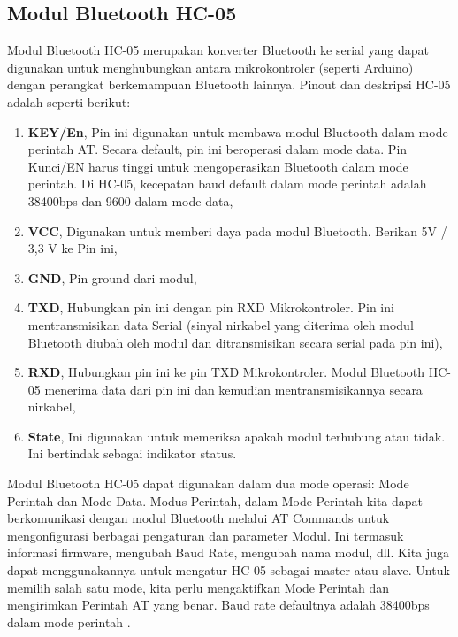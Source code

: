 \subsection{Modul Bluetooth HC-05}
\vspace{1ex}

Modul Bluetooth HC-05 merupakan konverter Bluetooth ke serial yang dapat digunakan untuk menghubungkan antara mikrokontroler (seperti Arduino) dengan perangkat berkemampuan Bluetooth lainnya. Pinout dan deskripsi HC-05 adalah seperti berikut:
\begin{enumerate}
	\vspace{-2mm}
	\item \textbf{KEY/En}, Pin ini digunakan untuk membawa modul Bluetooth dalam mode perintah AT. Secara default, pin ini beroperasi dalam mode data. Pin Kunci/EN harus tinggi untuk mengoperasikan Bluetooth dalam mode perintah. Di HC-05, kecepatan baud default dalam mode perintah adalah 38400bps dan 9600 dalam mode data,
	\vspace{-2mm}
	\item \textbf{VCC}, Digunakan untuk memberi daya pada modul Bluetooth. Berikan 5V / 3,3 V ke Pin ini,
	\vspace{-2mm}
	\item \textbf{GND}, Pin ground dari modul,
	\vspace{-2mm}
	\item \textbf{TXD}, Hubungkan pin ini dengan pin RXD Mikrokontroler. Pin ini mentransmisikan data Serial (sinyal nirkabel yang diterima oleh modul Bluetooth diubah oleh modul dan ditransmisikan secara serial pada pin ini),
	\vspace{-2mm}
	\item \textbf{RXD}, Hubungkan pin ini ke pin TXD Mikrokontroler. Modul Bluetooth HC-05 menerima data dari pin ini dan kemudian mentransmisikannya secara nirkabel,
	\vspace{-2mm}
	\item \textbf{State}, Ini digunakan untuk memeriksa apakah modul terhubung atau tidak. Ini bertindak sebagai indikator status.
\end{enumerate}

Modul Bluetooth HC-05 dapat digunakan dalam dua mode operasi: Mode Perintah dan Mode Data. Modus Perintah,
dalam Mode Perintah kita dapat berkomunikasi dengan modul Bluetooth melalui AT Commands untuk mengonfigurasi berbagai pengaturan dan parameter Modul. Ini termasuk informasi firmware, mengubah Baud Rate, mengubah nama modul, dll. Kita juga dapat menggunakannya untuk mengatur HC-05 sebagai master atau slave. Untuk memilih salah satu mode, kita perlu mengaktifkan Mode Perintah dan mengirimkan Perintah AT yang benar. Baud rate defaultnya adalah 38400bps dalam mode perintah .

